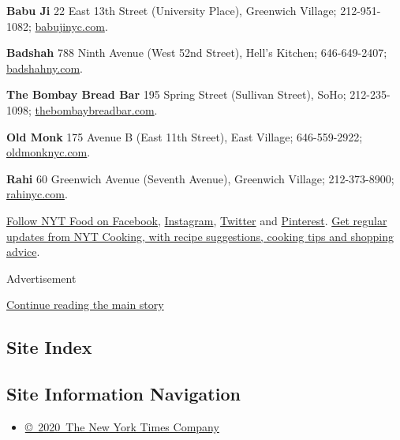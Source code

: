\textbf{Babu Ji} 22 East 13th Street (University Place), Greenwich
Village; 212-951-1082; \href{http://www.babujinyc.com/}{babujinyc.com}.

\textbf{Badshah} 788 Ninth Avenue (West 52nd Street), Hell's Kitchen;
646-649-2407; \href{http://badshahny.com/}{badshahny.com}.

\textbf{The Bombay Bread Bar} 195 Spring Street (Sullivan Street), SoHo;
212-235-1098;
\href{https://www.thebombaybreadbar.com/}{thebombaybreadbar.com}.

\textbf{Old Monk} 175 Avenue B (East 11th Street), East Village;
646-559-2922; \href{http://oldmonknyc.com/}{oldmonknyc.com}.

\textbf{Rahi} 60 Greenwich Avenue (Seventh Avenue), Greenwich Village;
212-373-8900; \href{https://www.rahinyc.com/}{rahinyc.com}.

\href{https://www.facebookcorewwwi.onion/nytfood/}{Follow NYT Food on
Facebook}, \href{https://instagram.com/nytfood}{Instagram},
\href{https://twitter.com/nytfood}{Twitter} and
\href{https://www.pinterest.com/nytfood/}{Pinterest}.
\href{https://www.nytimes3xbfgragh.onion/newsletters/cooking}{Get
regular updates from NYT Cooking, with recipe suggestions, cooking tips
and shopping advice}.

Advertisement

\protect\hyperlink{after-bottom}{Continue reading the main story}

\hypertarget{site-index}{%
\subsection{Site Index}\label{site-index}}

\hypertarget{site-information-navigation}{%
\subsection{Site Information
Navigation}\label{site-information-navigation}}

\begin{itemize}
\tightlist
\item
  \href{https://help.nytimes3xbfgragh.onion/hc/en-us/articles/115014792127-Copyright-notice}{©~2020~The
  New York Times Company}
\end{itemize}

